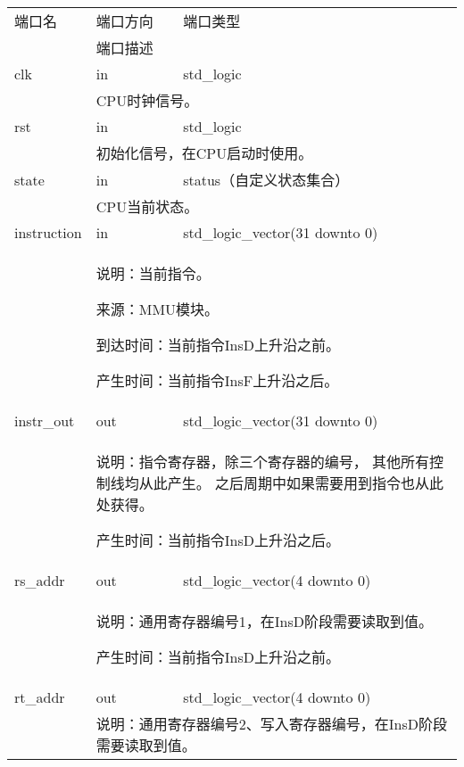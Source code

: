        \begin{tabularx}{\textwidth}{lll}
            \toprule
            端口名          & 端口方向  & 端口类型 \\
            \cmidrule(l){2-3}
            &
            \multicolumn{2}{X}{端口描述} \\
            \midrule
            clk             & in        & std\_logic \\
            \cmidrule(l){2-3}
            &
            \multicolumn{2}{X}{
                CPU时钟信号。
            } \\
            \midrule
            rst             & in        & std\_logic \\
            \cmidrule(l){2-3}
            &
            \multicolumn{2}{X}{
                初始化信号，在CPU启动时使用。
            } \\
            \midrule
            state           & in        & status（自定义状态集合） \\
            \cmidrule(l){2-3}
            &
            \multicolumn{2}{X}{
                CPU当前状态。
            } \\
            \midrule
            instruction     & in        & std\_logic\_vector(31 downto 0) \\
            \cmidrule(l){2-3}
            &
            \multicolumn{2}{X}{
                说明：当前指令。

                来源：MMU模块。

                到达时间：当前指令InsD上升沿之前。

                产生时间：当前指令InsF上升沿之后。
            } \\
            \midrule
            instr\_out      & out       & std\_logic\_vector(31 downto 0) \\
            \cmidrule(l){2-3}
            &
            \multicolumn{2}{X}{
                说明：指令寄存器，除三个寄存器的编号，%
                其他所有控制线均从此产生。%
                之后周期中如果需要用到指令也从此处获得。

                产生时间：当前指令InsD上升沿之后。
            } \\
            \midrule
            rs\_addr        & out       & std\_logic\_vector(4 downto 0) \\
            \cmidrule(l){2-3}
            &
            \multicolumn{2}{X}{
                说明：通用寄存器编号1，在InsD阶段需要读取到值。

                产生时间：当前指令InsD上升沿之前。
            } \\
            \midrule
            rt\_addr        & out       & std\_logic\_vector(4 downto 0) \\
            \cmidrule(l){2-3}
            &
            \multicolumn{2}{X}{
                说明：通用寄存器编号2、写入寄存器编号，在InsD阶段需要读取到值。

}
\end{tabularx}
